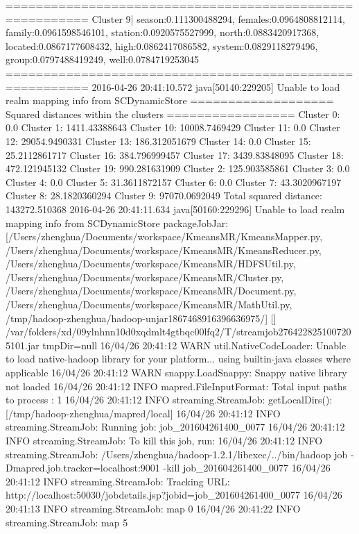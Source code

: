 ========================================================= 
Cluster 9| season:0.111300488294, females:0.0964808812114, family:0.0961598546101, station:0.0920575527999, north:0.0883420917368, located:0.0867177608432, high:0.0862417086582, system:0.0829118279496, group:0.0797488419249, well:0.0784719253045
========================================================= 
2016-04-26 20:41:10.572 java[50140:229205] Unable to load realm mapping info from SCDynamicStore
=================== Squared distances within the clusters =================
Cluster 0: 0.0
Cluster 1: 1411.43388643
Cluster 10: 10008.7469429
Cluster 11: 0.0
Cluster 12: 29054.9490331
Cluster 13: 186.312051679
Cluster 14: 0.0
Cluster 15: 25.2112861717
Cluster 16: 384.796999457
Cluster 17: 3439.83848095
Cluster 18: 472.121945132
Cluster 19: 990.281631909
Cluster 2: 125.903585861
Cluster 3: 0.0
Cluster 4: 0.0
Cluster 5: 31.3611872157
Cluster 6: 0.0
Cluster 7: 43.3020967197
Cluster 8: 28.1820360294
Cluster 9: 97070.0692049
Total squared distance: 143272.510368
2016-04-26 20:41:11.634 java[50160:229296] Unable to load realm mapping info from SCDynamicStore
packageJobJar: [/Users/zhenghua/Documents/workspace/KmeansMR/KmeansMapper.py, /Users/zhenghua/Documents/workspace/KmeansMR/KmeansReducer.py, /Users/zhenghua/Documents/workspace/KmeansMR/HDFSUtil.py, /Users/zhenghua/Documents/workspace/KmeansMR/Cluster.py, /Users/zhenghua/Documents/workspace/KmeansMR/Document.py, /Users/zhenghua/Documents/workspace/KmeansMR/MathUtil.py, /tmp/hadoop-zhenghua/hadoop-unjar1867468916396636975/] [] /var/folders/xd/09ylnhnn10d0xqdmlt4gtbqc00lfq2/T/streamjob2764228251007205101.jar tmpDir=null
16/04/26 20:41:12 WARN util.NativeCodeLoader: Unable to load native-hadoop library for your platform... using builtin-java classes where applicable
16/04/26 20:41:12 WARN snappy.LoadSnappy: Snappy native library not loaded
16/04/26 20:41:12 INFO mapred.FileInputFormat: Total input paths to process : 1
16/04/26 20:41:12 INFO streaming.StreamJob: getLocalDirs(): [/tmp/hadoop-zhenghua/mapred/local]
16/04/26 20:41:12 INFO streaming.StreamJob: Running job: job_201604261400_0077
16/04/26 20:41:12 INFO streaming.StreamJob: To kill this job, run:
16/04/26 20:41:12 INFO streaming.StreamJob: /Users/zhenghua/hadoop-1.2.1/libexec/../bin/hadoop job  -Dmapred.job.tracker=localhost:9001 -kill job_201604261400_0077
16/04/26 20:41:12 INFO streaming.StreamJob: Tracking URL: http://localhost:50030/jobdetails.jsp?jobid=job_201604261400_0077
16/04/26 20:41:13 INFO streaming.StreamJob:  map 0%
16/04/26 20:41:22 INFO streaming.StreamJob:  map 5%
